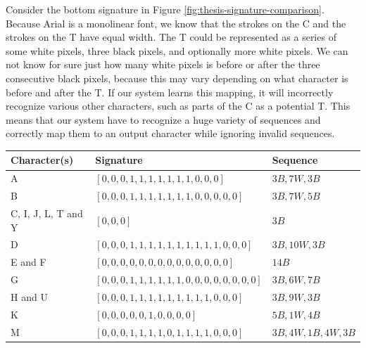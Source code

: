 Consider the bottom signature in Figure \ref{fig:thesis-signature-comparison}. Because Arial is a monolinear font, we know that the strokes on the C and the strokes on the T have equal width. The T could be represented as a series of some white pixels, three black pixels, and optionally more white pixels. We can not know for sure just how many white pixels is before or after the three consecutive black pixels, because this may vary depending on what character is before and after the T. If our system learns this mapping, it will incorrectly recognize various other characters, such as parts of the C as a potential T. This means that our system have to recognize a huge variety of sequences and correctly map them to an output character while ignoring invalid sequences.

\begin{table}[ht]
    \centering
    \begin{tabular}{|l|l|l|}
        \hline 
        \textbf{Character(s)} & \textbf{Signature}                                    & \textbf{Sequence}            \\ \hline
        A                     & \([0, 0, 0, 1, 1, 1, 1, 1, 1, 1, 0, 0, 0]\)             & \(3B, 7W, 3B\)                 \\ \hline
        B                     & \([0, 0, 0, 1, 1, 1, 1, 1, 1, 1, 0, 0, 0, 0, 0]\)       & \(3B, 7W, 5B\)                 \\ \hline
        C, I, J, L, T and Y   & \([0, 0, 0]\)                                           & \(3B\)                         \\ \hline
        D                     & \([0, 0, 0, 1, 1, 1, 1, 1, 1, 1, 1, 1, 1, 0, 0, 0]\)    & \(3B, 10W, 3B\)                \\ \hline
        E and F               & \([0, 0, 0, 0, 0, 0, 0, 0, 0, 0, 0, 0, 0, 0]\)          & \(14B\)                        \\ \hline
        G                     & \([0, 0, 0, 1, 1, 1, 1, 1, 1, 0, 0, 0, 0, 0, 0, 0, 0]\) & \(3B, 6W, 7B\)                 \\ \hline
        H and U               & \([0, 0, 0, 1, 1, 1, 1, 1, 1, 1, 1, 1, 0, 0, 0]\)       & \(3B, 9W, 3B\)                 \\ \hline
        K                     & \([0, 0, 0, 0, 0, 1, 0, 0, 0, 0]\)                      & \(5B, 1W, 4B\)                 \\ \hline
        M                     & \([0, 0, 0, 1, 1, 1, 1, 0, 1, 1, 1, 1, 0, 0, 0]\)       & \(3B, 4W, 1B, 4W, 3B\)         \\ \hline

\end{tabular}
\end{table}
